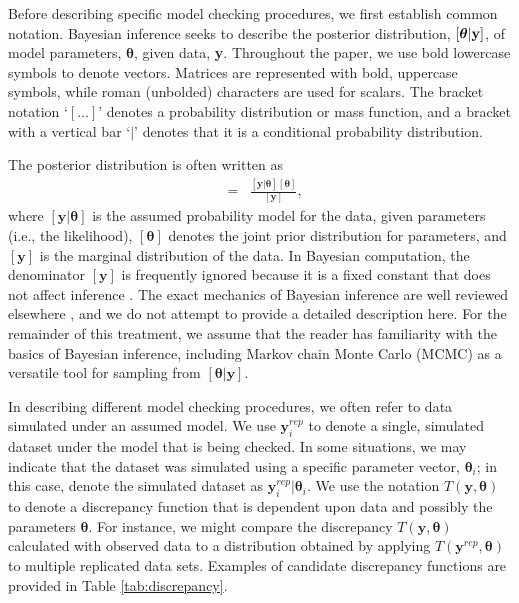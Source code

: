 \documentclass[12pt,english]{article}
\begin{document}
\begin{spacing}{1.9}
Before describing specific model checking procedures, we first
establish common notation.  Bayesian inference seeks to describe the
posterior distribution, $[\boldsymbol{\theta} | {\bf y}]$, of model
parameters, $\boldsymbol{\theta}$, given data, \textbf{y}.  Throughout
the paper, we use bold lowercase symbols to denote vectors.  Matrices
are represented with bold, uppercase symbols, while roman (unbolded)
characters are used for scalars.  The bracket notation `$[ \hdots ]$'
denotes a probability distribution or mass function, and a bracket
with a vertical bar `$|$' denotes that it is a conditional probability
distribution.

The posterior distribution is often written as
\begin{eqnarray}
  [\boldsymbol{\theta} | \textbf{y}] & = & \frac{[\textbf{y} | \boldsymbol{\theta}] [\boldsymbol{\theta}]}{[\textbf{y}]},
\end{eqnarray}
where $[\textbf{y}|\boldsymbol{\theta}]$ is the assumed probability
model for the data, given parameters (i.e., the likelihood),
$[\boldsymbol{\theta}]$ denotes the joint prior distribution for
parameters, and $[\textbf{y}]$ is the marginal distribution of the
data.  In Bayesian computation, the denominator $[\textbf{y}]$ is
frequently ignored because it is a fixed constant that does not affect
inference \citep[although it is needed when computing Bayes factors
for model comparison and averaging;][]{LinkBarker2006}.  The exact
mechanics of Bayesian inference are well reviewed elsewhere
\citep[e.g.,][]{KingEtAl2009,LinkBarker2010,HobbsHooten2015}, and we
do not attempt to provide a detailed description here.  For the
remainder of this treatment, we assume that the reader has familiarity
with the basics of Bayesian inference, including Markov chain Monte
Carlo (MCMC) as a versatile tool for sampling from
$[\boldsymbol{\theta}|\textbf{y}]$.

In describing different model checking procedures, we often refer to
data simulated under an assumed model.  We use $\textbf{y}_i^{rep}$ to
denote a single, simulated dataset under the model that is being
checked.  In some situations, we may indicate that the dataset was
simulated using a specific parameter vector, $\boldsymbol{\theta}_i$;
in this case, denote the simulated dataset as
$\textbf{y}_i^{rep}|\boldsymbol{\theta}_i$.  We use the notation
$T(\textbf{y},\boldsymbol{\theta})$ to denote a discrepancy function
that is dependent upon data and possibly the parameters
$\boldsymbol{\theta}$.  For instance, we might compare the discrepancy
$T(\textbf{y},\boldsymbol{\theta})$ calculated with observed data to a
distribution obtained by applying
$T(\textbf{y}^{rep},\boldsymbol{\theta})$ to multiple replicated data
sets.  Examples of candidate discrepancy functions are provided in
Table \ref{tab:discrepancy}.


\end{spacing}
\end{document}
